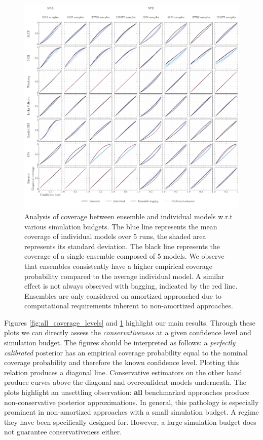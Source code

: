 \documentclass[twoside]{article}
\begin{document}
\begin{figure}[h!]
    \includegraphics[width=\textwidth]{figures/coverage_multi_ensemble_with_bagging.pdf}
    \caption{Analysis of coverage between ensemble and individual models w.r.t various simulation budgets. The blue line represents the mean coverage of individual models over 5 runs, the shaded area represents its standard deviation. The black line represents the coverage of a single ensemble composed of 5 models. We observe that ensembles consistently have a higher empirical coverage probability compared to the average individual model. A similar effect is not always observed with bagging, indicated by the red line. Ensembles are only considered on amortized approached due to computational requirements inherent to non-amortized approaches.}
    \label{fig:coverage_ensemble}
\end{figure}
Figures \ref{fig:all_coverage_levels} and \ref{fig:coverage_ensemble} highlight our main results. Through these plots we can directly assess the \emph{conservativeness} at a given confidence level and simulation budget. The figures should be interpreted as follows: a \emph{perfectly calibrated} posterior has an empirical coverage probability equal to the nominal coverage probability and therefore the known confidence level. Plotting this relation produces a diagonal line. Conservative estimators on the other hand produce curves above the diagonal and overconfident models underneath.
The plots highlight an unsettling observation: {\bfseries all} benchmarked approaches produce non-conservative posterior approximations. In general, this pathology is especially prominent in non-amortized approaches with a small simulation budget. A regime they have been specifically designed for. However, a large simulation budget does not guarantee conservativeness either.
\end{document}
